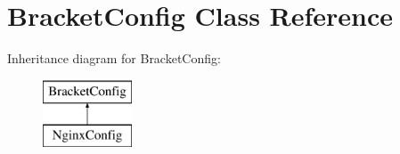 \hypertarget{class_config_styles_1_1_bracket_config_1_1_bracket_config}{
\section{\-Bracket\-Config \-Class \-Reference}
\label{class_config_styles_1_1_bracket_config_1_1_bracket_config}
}
\-Inheritance diagram for \-Bracket\-Config\-:\begin{figure}[H]
\begin{center}
\leavevmode
\includegraphics[height=2.000000cm]{class_config_styles_1_1_bracket_config_1_1_bracket_config}
\end{center}
\end{figure}
